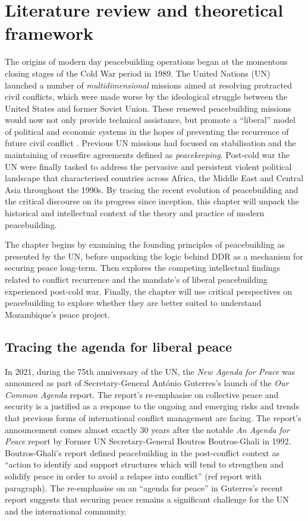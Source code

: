 \chapter{Literature review and theoretical framework}
\label{chp:Lit}

The origins of modern day peacebuilding operations began at the momentous closing stages of the Cold War period in 1989. The United Nations (UN) launched a number of \emph{multidimensional} missions aimed at resolving protracted civil conflicts, which were made worse by the ideological struggle between the United States and former Soviet Union. These renewed peacebuilding missions would now not only provide technical assistance, but promote a ``liberal'' model of political and economic systems in the hopes of preventing the recurrence of future civil conflict \citep[chap.~2]{paris2004war}. Previous UN missions had focused on stabilisation and the maintaining of ceasefire agreements defined as \emph{peacekeeping}. Post-cold war the UN were finally tasked to address the pervasive and persistent violent political landscape that characterised countries across Africa, the Middle East and Central Asia throughout the 1990s. By tracing the recent evolution of peacebuilding and the critical discourse on its progress since inception, this chapter will unpack the historical and intellectual context of the theory and practice of modern peacebuilding. 

The chapter begins by examining the founding principles of peacebuilding as presented by the UN, before unpacking the logic behind DDR as a mechanism for securing peace long-term. Then explores the competing intellectual findings related to conflict recurrence and the mandate's of liberal peacebuilding experienced post-cold war. Finally, the chapter will use critical perspectives on peacebuilding to explore whether they are better suited to understand Mozambique's peace project.  

\section{Tracing the agenda for liberal peace}

In 2021, during the 75th anniversary of the UN, the \emph{New Agenda for Peace} was announced as part of Secretary-General Ant\'{o}nio Guterres's launch of the \emph{Our Common Agenda} report. The report's re-emphasise on collective peace and security is a justified as a response to the ongoing and emerging risks and trends that previous forms of international conflict management are facing. The report's announcement comes almost exactly 30 years after the notable \emph{An Agenda for Peace} report by Former UN Secretary-General Boutros Boutros-Ghali in 1992. Boutros-Ghali's report defined peacebuilding in the post-conflict context as ``action to identify and support structures which will tend to strengthen and solidify peace in order to avoid a relapse into conflict'' (ref report with paragraph).  The re-emphasise on an ``agenda for peace'' in Guterres's recent report suggests that securing peace remains a significant challenge for the UN and the international community. 


